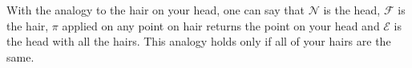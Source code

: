 With the analogy to the hair on your head, one can say that $\mathcal N$ is the head, $\mathcal F$ is the hair, $\pi$ applied on any point on hair returns the point on your head and $\mathcal E$ is the head with all the hairs. This analogy holds only if all of your hairs are the same.










